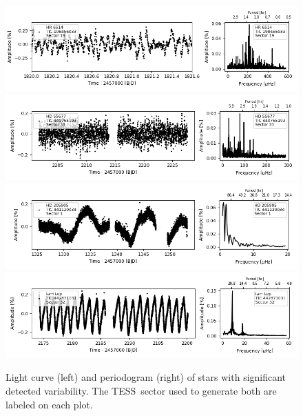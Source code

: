 \documentclass[twocolumn]{aastex631}
\newcommand{\tess}{TESS}
\begin{document}
\begin{figure}
\centering
    \includegraphics[width=0.9\linewidth]{figures/tic00000198456033_s019_norm1.fits}
    \includegraphics[width=0.9\linewidth]{figures/tic00000440765193_s033_flat1.fits.png}
    \includegraphics[width=0.9\linewidth]{figures/tic00000441120034_s001_normH.fits.png}
    \includegraphics[width=0.9\linewidth]{figures/tic00000442871031_s032_norm1.fits.png}

    \caption{Light curve (left) and periodogram (right) of stars with significant detected variability. The \tess\ sector used to generate both are labeled on each plot.}
    \label{fig:lcft2}
\end{figure}
\end{document}
